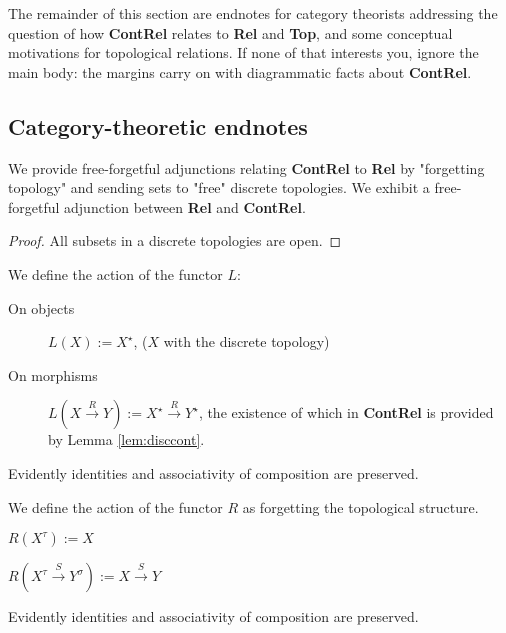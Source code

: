 \begin{marginfigure}
 The remainder of this section are endnotes for category theorists addressing the question of how \textbf{ContRel} relates to \textbf{Rel} and \textbf{Top}, and some conceptual motivations for topological relations. If none of that interests you, ignore the main body: the margins carry on with diagrammatic facts about \textbf{ContRel}.

\newpage

\subsection{Category-theoretic endnotes}


We provide free-forgetful adjunctions relating \textbf{ContRel} to \textbf{Rel} by "forgetting topology" and sending sets to "free" discrete topologies. We exhibit a free-forgetful adjunction between \textbf{Rel} and \textbf{ContRel}.

\begin{lemma}\label{lem:disccont}
\begin{proof}
All subsets in a discrete topologies are open.
\end{proof}
\end{lemma}

\begin{defn} We define the action of the functor $L$:
\begin{description}
\item[On objects] $L(X) := X^\star$, ($X$ with the discrete topology)
\item[On morphisms] $L(X \overset{R}{\rightarrow} Y) := X^\star \overset{R}{\rightarrow} Y^\star$, the existence of which in \textbf{ContRel} is provided by Lemma \ref{lem:disccont}.
\end{description}
Evidently identities and associativity of composition are preserved.
\end{defn}

\begin{defn}
\begin{description} We define the action of the functor $R$ as forgetting the topological structure.
\item[On objects] $R(X^\tau) := X$
\item[On morphisms] $R(X^\tau \overset{S}{\rightarrow} Y^\sigma) := X \overset{S}{\rightarrow} Y$
\end{description}
Evidently identities and associativity of composition are preserved.
\end{defn}


\end{marginfigure}
